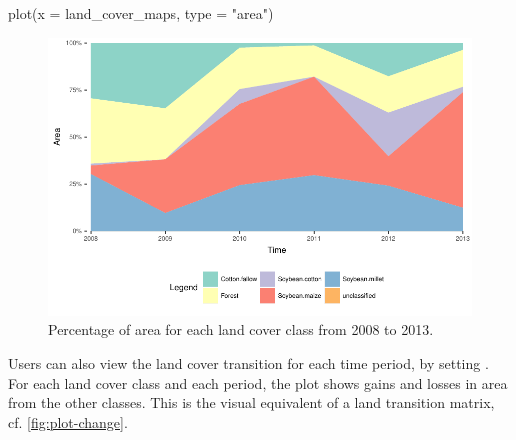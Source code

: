 \documentclass[article,shortnames]{jss}
\begin{document}
\begin{CodeChunk}
\begin{CodeInput}
plot(x = land_cover_maps, type = "area")
\end{CodeInput}
\begin{figure}[!ht]

{\centering \includegraphics{applying_twdtw_files/figure-latex/plot-area-1} 

}

\caption[Percentage of area for each land cover class from 2008 to 2013]{Percentage of area for each land cover class from 2008 to 2013.}\label{fig:plot-area}
\end{figure}
\end{CodeChunk}

Users can also view the land cover transition for each time period, by
setting . For each land cover class and each
period, the plot shows gains and losses in area from the other classes.
This is the visual equivalent of a land transition matrix, cf.
\autoref{fig:plot-change}.
\end{document}
